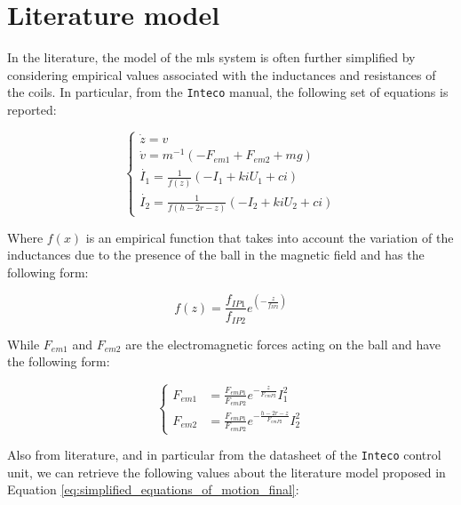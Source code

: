 

\section{Literature model}
\label{sec:literature_model}

In the literature, the model of the \acrshort{mls} system is often further simplified by considering empirical values associated with the inductances and resistances of the coils.
In particular, from the \texttt{Inteco} manual, the following set of equations is reported:

\begin{equation}
    \begin{cases}
        \dot{z} = v                                                  \\
        \dot{v} = m^{-1} \left(-F_{em1} + F_{em2} + m g  \right)     \\
        \dot{I_1} = \frac{1}{f(z)} \left(- I_1 + ki U_1 + ci \right) \\
        \dot{I_2} = \frac{1}{f(h - 2r - z)} \left(- I_2 + ki U_2 + ci \right)
    \end{cases}
    \label{eq:simplified_equations_of_motion_final}
\end{equation}

Where $f(x)$ is an empirical function that takes into account the variation of the inductances due to the presence of the ball in the magnetic field and has the following form:

\begin{equation}
    f(z) = \frac{f_{IP1}}{f_{IP2}} e^{\left(-\frac{z}{f_{IP2}}\right)}
\end{equation}

While $F_{em1}$ and $F_{em2}$ are the electromagnetic forces acting on the ball and have the following form:

\begin{equation}
    \begin{cases}
        F_{em1} & = \frac{F_{emP1}}{F_{emP2}} e^{-\frac{z}{F_{emP2}}}  I_1^2          \\
        F_{em2} & = \frac{F_{emP1}}{F_{emP2}} e^{-\frac{h - 2r - z}{F_{emP2}}}  I_2^2
    \end{cases}
\end{equation}


Also from literature, and in particular from the datasheet of the \texttt{Inteco} control unit, we can retrieve the following values about the literature model proposed in Equation \ref{eq:simplified_equations_of_motion_final}:

